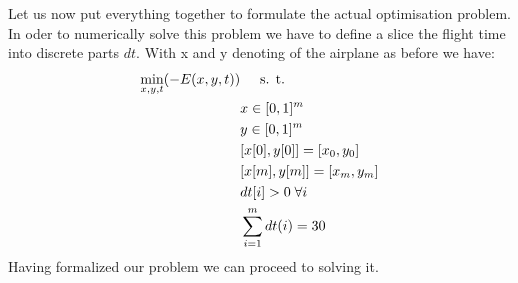 Let us now put everything together to formulate the actual optimisation problem. In oder to numerically solve this problem we have to define a slice the flight time into discrete parts $dt$. With x and y denoting of the airplane as before we have:
\begin{align}
\min_{x,y,t }( -E(x,y,t)) & \hspace{5mm} \text{s. t. } \\
& x \in [0,1]^m\\
& y \in [0,1]^m\\
& [x[0],y[0]] = [x_0,y_0] \\
& [x[m],y[m]] = [x_m,y_m] \\
& dt[i] > 0 \; \forall i\\
& \sum_{i=1}^m dt(i) = 30 
\end{align}
Having formalized our problem we can proceed to solving it.

